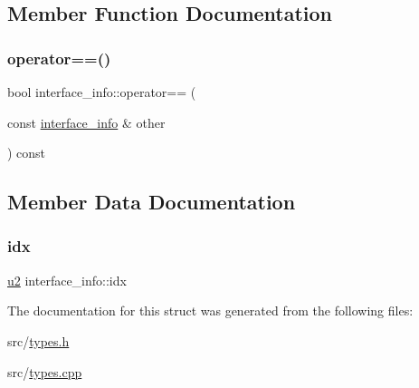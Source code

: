 \subsection{Member Function Documentation}
\mbox{\label{structinterface__info_a5c19fb8052240030f2cc96876e78ed07}} 
\subsubsection{\texorpdfstring{operator==()}{operator==()}}
{\footnotesize\ttfamily bool interface\+\_\+info\+::operator== (\begin{DoxyParamCaption}\item[{const \hyperlink{structinterface__info}{interface\+\_\+info} \&}]{other }\end{DoxyParamCaption}) const}



\subsection{Member Data Documentation}
\mbox{\label{structinterface__info_a81fa7682cd2b314e79cb6ace44fda442}} 
\subsubsection{\texorpdfstring{idx}{idx}}
{\footnotesize\ttfamily \hyperlink{types_8h_ae676e9207f57fb921dca7366b2f59c53}{u2} interface\+\_\+info\+::idx}



The documentation for this struct was generated from the following files\+:\begin{DoxyCompactItemize}
\item 
src/\hyperlink{types_8h}{types.\+h}\item 
src/\hyperlink{types_8cpp}{types.\+cpp}\end{DoxyCompactItemize}
